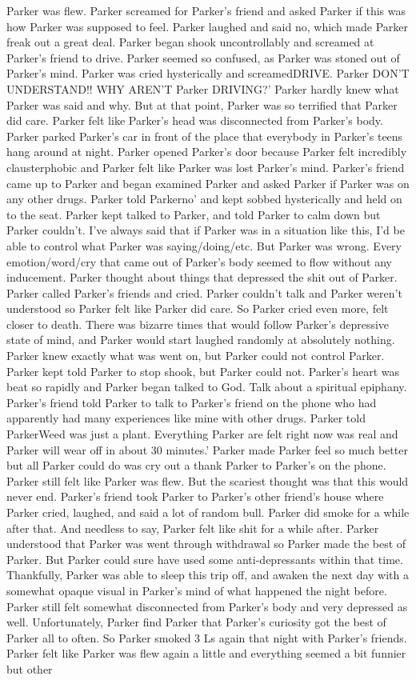 \documentclass[12pt]{book}
\begin{document}
Parker was flew. Parker screamed for Parker's friend and asked Parker if this was how Parker was supposed to feel. Parker laughed and said no, which made Parker freak out a great deal. Parker began shook uncontrollably and screamed at Parker's friend to drive. Parker seemed so confused, as Parker was stoned out of Parker's mind. Parker was cried hysterically and screamedDRIVE. Parker DON'T UNDERSTAND!! WHY AREN'T Parker DRIVING?' Parker hardly knew what Parker was said and why. But at that point, Parker was so terrified that Parker did care. Parker felt like Parker's head was disconnected from Parker's body. Parker parked Parker's car in front of the place that everybody in Parker's teens hang around at night. Parker opened Parker's door because Parker felt incredibly clausterphobic and Parker felt like Parker was lost Parker's mind. Parker's friend came up to Parker and began examined Parker and asked Parker if Parker was on any other drugs. Parker told Parkerno' and kept sobbed hysterically and held on to the seat. Parker kept talked to Parker, and told Parker to calm down but Parker couldn't. I've always said that if Parker was in a situation like this, I'd be able to control what Parker was saying/doing/etc. But Parker was wrong. Every emotion/word/cry that came out of Parker's body seemed to flow without any inducement. Parker thought about things that depressed the shit out of Parker. Parker called Parker's friends and cried. Parker couldn't talk and Parker weren't understood so Parker felt like Parker did care. So Parker cried even more, felt closer to death. There was bizarre times that would follow Parker's depressive state of mind, and Parker would start laughed randomly at absolutely nothing. Parker knew exactly what was went on, but Parker could not control Parker. Parker kept told Parker to stop shook, but Parker could not. Parker's heart was beat so rapidly and Parker began talked to God. Talk about a spiritual epiphany. Parker's friend told Parker to talk to Parker's friend on the phone who had apparently had many experiences like mine with other drugs. Parker told ParkerWeed was just a plant. Everything Parker are felt right now was real and Parker will wear off in about 30 minutes.' Parker made Parker feel so much better but all Parker could do was cry out a thank Parker to Parker's on the phone. Parker still felt like Parker was flew. But the scariest thought was that this would never end. Parker's friend took Parker to Parker's other friend's house where Parker cried, laughed, and said a lot of random bull. Parker did smoke for a while after that. And needless to say, Parker felt like shit for a while after. Parker understood that Parker was went through withdrawal so Parker made the best of Parker. But Parker could sure have used some anti-depressants within that time. Thankfully, Parker was able to sleep this trip off, and awaken the next day with a somewhat opaque visual in Parker's mind of what happened the night before. Parker still felt somewhat disconnected from Parker's body and very depressed as well. Unfortunately, Parker find Parker that Parker's curiosity got the best of Parker all to often. So Parker smoked 3 Ls again that night with Parker's friends. Parker felt like Parker was flew again a little and everything seemed a bit funnier but other 
\end{document}
